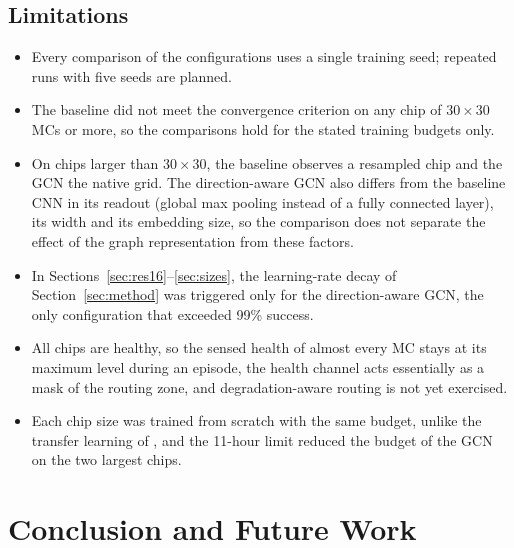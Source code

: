 \documentclass[11pt,a4paper]{article}
\begin{document}
\subsection{Limitations}
\begin{itemize}
  \item Every comparison of the configurations uses a single training seed;
        repeated runs with five seeds are planned.
  \item The baseline did not meet the convergence criterion on any chip of
        $30\times30$ MCs or more, so the comparisons hold for the stated
        training budgets only.
  \item On chips larger than $30\times30$, the baseline observes a resampled
        chip and the GCN the native grid. The direction-aware GCN also
        differs from the baseline CNN in its readout (global max pooling
        instead of a fully connected layer), its width and its embedding size,
        so the comparison does not separate the effect of the graph
        representation from these factors.
  \item In Sections~\ref{sec:res16}--\ref{sec:sizes}, the learning-rate decay of
        Section~\ref{sec:method} was triggered only for the direction-aware
        GCN, the only configuration that exceeded 99\% success.
  \item All chips are healthy, so the sensed health of almost every MC stays
        at its maximum level during an episode, the health channel acts
        essentially as a mask of the routing zone, and degradation-aware
        routing is not yet exercised.
  \item Each chip size was trained from scratch with the same budget, unlike
        the transfer learning of \cite{elfar2023}, and the 11-hour limit
        reduced the budget of the GCN on the two largest chips.
\end{itemize}

\section{Conclusion and Future Work}\label{sec:conclusion}
\end{document}

